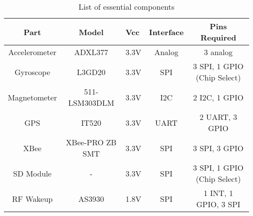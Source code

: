 \begin{table}[htbp]
  \centering
  \caption{List of essential components}
    \begin{tabular}{|c|c|m{0.35in}|c|c|}
    \hline
    Part  & Model & \centering Vcc & Interface & Pins Required \\
    \hline \hline
    Accelerometer & ADXL377 & \centering 3.3V  & Analog & 3 analog \\ \hline
    Gyroscope & L3GD20 & \centering 3.3V  & SPI   & 3 SPI, 1 GPIO (Chip Select) \\ \hline
    Magnetometer & 511-LSM303DLM & \centering 3.3V  & I2C   & 2 I2C, 1 GPIO \\ \hline
    GPS   & IT520 & \centering 3.3V   & UART  & 2 UART, 3 GPIO \\ \hline 
    XBee  & XBee-PRO ZB SMT &\centering 3.3V  & SPI   & 3 SPI, 3 GPIO \\ \hline
    SD Module &   -    & \centering 3.3V  & SPI   & 3 SPI, 1 GPIO (Chip Select) \\ \hline
    RF Wakeup & AS3930 & \centering 1.8V  & SPI   & 1 INT, 1 GPIO, 3 SPI \\ \hline
    
    \end{tabular}%
  \label{tab:componentPinCount}%
\end{table}%


